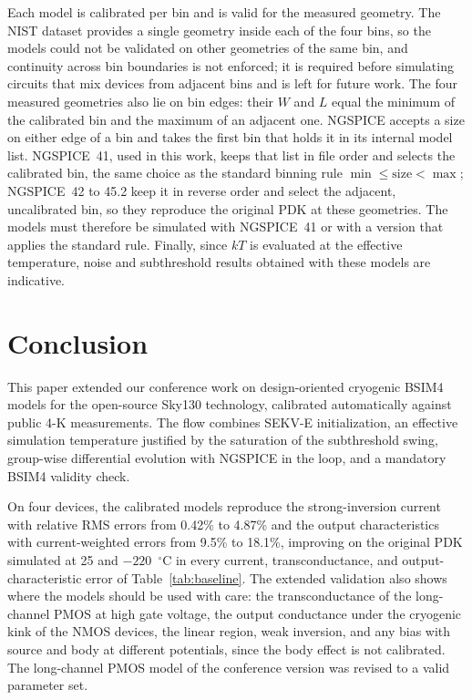 \documentclass[a4paper,10pt,twoside,twocolumn,final]{JICS_LaTexGuidelines} %
\begin{document}
Each model is calibrated per bin and is valid for the measured geometry. The NIST dataset provides a single geometry inside each of the four bins, so the models could not be validated on other geometries of the same bin, and continuity across bin boundaries is not enforced; it is required before simulating circuits that mix devices from adjacent bins and is left for future work. The four measured geometries also lie on bin edges: their $W$ and $L$ equal the minimum of the calibrated bin and the maximum of an adjacent one. NGSPICE accepts a size on either edge of a bin and takes the first bin that holds it in its internal model list. NGSPICE~41, used in this work, keeps that list in file order and selects the calibrated bin, the same choice as the standard binning rule $\min\le\mathrm{size}<\max$; NGSPICE~42 to 45.2 keep it in reverse order and select the adjacent, uncalibrated bin, so they reproduce the original PDK at these geometries. The models must therefore be simulated with NGSPICE~41 or with a version that applies the standard rule. Finally, since $kT$ is evaluated at the effective temperature, noise and subthreshold results obtained with these models are indicative.

\section{Conclusion}

This paper extended our conference work on design-oriented cryogenic BSIM4 models for the open-source Sky130 technology, calibrated automatically against public 4-K measurements. The flow combines SEKV-E initialization, an effective simulation temperature justified by the saturation of the subthreshold swing, group-wise differential evolution with NGSPICE in the loop, and a mandatory BSIM4 validity check.

On four devices, the calibrated models reproduce the strong-inversion current with relative RMS errors from 0.42\% to 4.87\% and the output characteristics with current-weighted errors from 9.5\% to 18.1\%, improving on the original PDK simulated at 25 and $-220$~$^\circ$C in every current, transconductance, and output-characteristic error of Table~\ref{tab:baseline}. The extended validation also shows where the models should be used with care: the transconductance of the long-channel PMOS at high gate voltage, the output conductance under the cryogenic kink of the NMOS devices, the linear region, weak inversion, and any bias with source and body at different potentials, since the body effect is not calibrated. The long-channel PMOS model of the conference version was revised to a valid parameter set.
\end{document}
